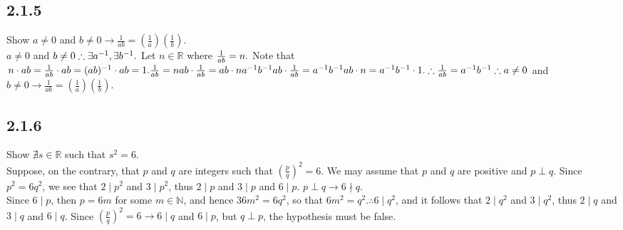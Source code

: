 \documentclass{article}
\begin{document}
\subsection{2.1.5}
Show $a \neq 0$ and $b \neq 0 \rightarrow \frac{1}{ab} =
(\frac{1}{a})(\frac{1}{b})$.
\\$a \neq 0$ and $b \neq 0
\\\therefore \exists a^{-1}, \exists b^{-1}.
\\$ Let $n \in \mathbb{R}$ where $\frac{1}{ab} = n.
\\$ Note that $n \cdot ab = \frac{1}{ab} \cdot ab = (ab)^{-1} \cdot ab = 1.
\\\frac{1}{ab} = n
\\ab \cdot \frac{1}{ab} = ab \cdot n
\\a^{-1}b^{-1}ab \cdot \frac{1}{ab} = a^{-1}b^{-1}ab \cdot n =
a^{-1}b^{-1} \cdot 1.
\\\therefore \frac{1}{ab} = a^{-1}b^{-1}
\\\therefore a \neq 0$ and $b \neq 0 \rightarrow \frac{1}{ab} =
(\frac{1}{a})(\frac{1}{b})$.

\subsection{2.1.6}
Show $\nexists s \in \mathbb{R}$ such that $s^2 = 6$.
\\Suppose, on the contrary, that $p$ and $q$ are integers such that
$(\frac{p}{q})^2 = 6$. We may assume that $p$ and $q$ are positive and
$p \perp q$. Since $p^2 = 6q^2$, we see that $2 \mid p^2$ and $3 \mid p^2$,
thus $2 \mid p$ and $3 \mid p$ and $6 \mid p$. $p \perp q \rightarrow
6 \nmid q$.
\\Since $6 \mid p$, then $p = 6m$ for some $m \in \mathbb{N}$, and hence
$36m^2 = 6q^2$, so that $6m^2 = q^2. \therefore 6 \mid q^2$, and it follows
that $2 \mid q^2$ and $3 \mid q^2$, thus $2 \mid q$ and $3 \mid q$ and
$6 \mid q$. Since $(\frac{p}{q})^2 = 6 \rightarrow 6 \mid q$ and $6 \mid p$,
but $q \perp p$, the hypothesis must be false.
\end{document}
